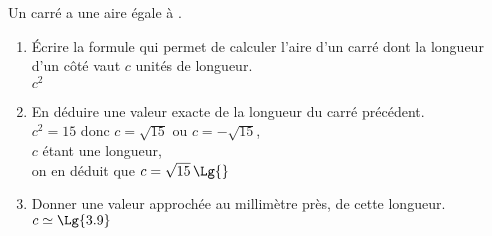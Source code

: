     Un carré a une aire égale à .

    \begin{enumerate}
        \item Écrire la formule qui permet de calculer l'aire d'un carré dont la longueur d'un côté vaut $c$ unités de longueur.\\
        {\red $c^2$}
        \item En déduire une valeur exacte de la longueur du carré précédent.\\
        {\red $c^2=15$ donc $c=\sqrt{15}$ ou $c=-\sqrt{15}$,\\ $c$ étant une longueur,\\ on en déduit que $c=\sqrt{15}\,\Lg{}$}
        \item Donner une valeur approchée au millimètre près, de cette longueur.\\
        {\red $c\simeq \Lg{3.9}$}
    \end{enumerate}
